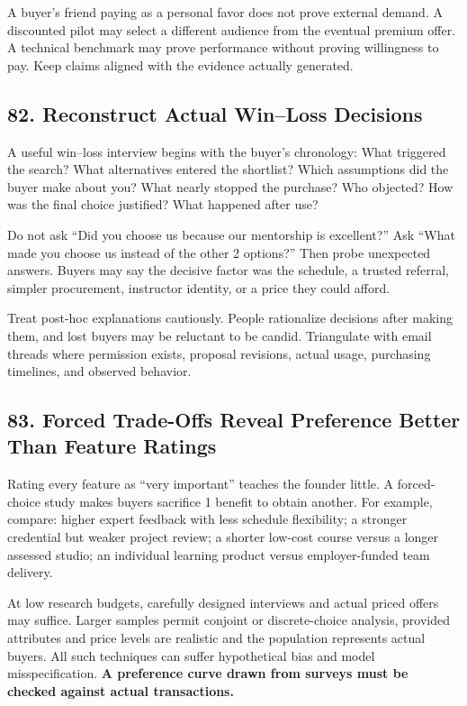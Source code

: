 A buyer's friend paying as a personal favor does not prove external demand. A discounted pilot may select a different audience from the eventual premium offer. A technical benchmark may prove performance without proving willingness to pay. Keep claims aligned with the evidence actually generated.

\subsection*{82. Reconstruct Actual Win--Loss Decisions}

A useful win--loss interview begins with the buyer's chronology: What triggered the search? What alternatives entered the shortlist? Which assumptions did the buyer make about you? What nearly stopped the purchase? Who objected? How was the final choice justified? What happened after use?

Do not ask ``Did you choose us because our mentorship is excellent?'' Ask ``What made you choose us instead of the other 2 options?'' Then probe unexpected answers. Buyers may say the decisive factor was the schedule, a trusted referral, simpler procurement, instructor identity, or a price they could afford.

Treat post-hoc explanations cautiously. People rationalize decisions after making them, and lost buyers may be reluctant to be candid. Triangulate with email threads where permission exists, proposal revisions, actual usage, purchasing timelines, and observed behavior.

\subsection*{83. Forced Trade-Offs Reveal Preference Better Than Feature Ratings}

Rating every feature as ``very important'' teaches the founder little. A forced-choice study makes buyers sacrifice 1 benefit to obtain another. For example, compare: higher expert feedback with less schedule flexibility; a stronger credential but weaker project review; a shorter low-cost course versus a longer assessed studio; an individual learning product versus employer-funded team delivery.

At low research budgets, carefully designed interviews and actual priced offers may suffice. Larger samples permit conjoint or discrete-choice analysis, provided attributes and price levels are realistic and the population represents actual buyers. All such techniques can suffer hypothetical bias and model misspecification. \textbf{A preference curve drawn from surveys must be checked against actual transactions.}

